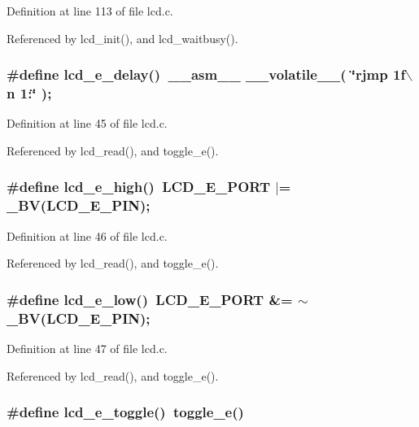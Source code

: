 Definition at line 113 of file lcd.c.

Referenced by lcd\_\-init(), and lcd\_\-waitbusy().
\subsubsection{\setlength{\rightskip}{0pt plus 5cm}\#define lcd\_\-e\_\-delay()~\_\-\_\-asm\_\-\_\- \_\-\_\-volatile\_\-\_\-( \char`\"{}rjmp 1f$\backslash$n 1:\char`\"{} );}\label{lcd_8c_bd01e64562ef0e704b5402884a269901}




Definition at line 45 of file lcd.c.

Referenced by lcd\_\-read(), and toggle\_\-e().
\subsubsection{\setlength{\rightskip}{0pt plus 5cm}\#define lcd\_\-e\_\-high()~LCD\_\-E\_\-PORT  $|$=  \_\-BV(LCD\_\-E\_\-PIN);}\label{lcd_8c_36e38738cd00287b6fb42ff683029aad}




Definition at line 46 of file lcd.c.

Referenced by lcd\_\-read(), and toggle\_\-e().
\subsubsection{\setlength{\rightskip}{0pt plus 5cm}\#define lcd\_\-e\_\-low()~LCD\_\-E\_\-PORT  \&= $\sim$\_\-BV(LCD\_\-E\_\-PIN);}\label{lcd_8c_5ca48e29e8aab0646fc0e23c59f6485d}




Definition at line 47 of file lcd.c.

Referenced by lcd\_\-read(), and toggle\_\-e().
\subsubsection{\setlength{\rightskip}{0pt plus 5cm}\#define lcd\_\-e\_\-toggle()~toggle\_\-e()}\label{lcd_8c_52d741874ca8c3c1a30a4955e8794e36}




